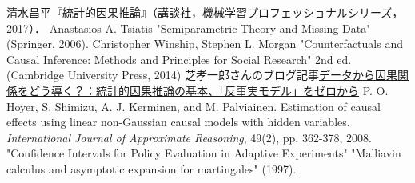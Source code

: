 \documentclass[uplatex,dvipdfmx]{jsreport}
\begin{document}
\begin{thebibliography}{99}
    清水昌平『統計的因果推論』（講談社，機械学習プロフェッショナルシリーズ，2017）．
    Anastasios A. Tsiatis "Semiparametric Theory and Missing Data" (Springer, 2006).
    Christopher Winship, Stephen L. Morgan "Counterfactuals and Causal Inference: Methods and Principles for Social Research" 2nd ed. (Cambridge University Press, 2014)
    芝孝一郎さんのブログ記事\href{https://www.krsk-phs.com/entry/counterfactual_assumptions}{データから因果関係をどう導く？：統計的因果推論の基本、「反事実モデル」をゼロから}
    P. O. Hoyer, S. Shimizu, A. J. Kerminen, and M. Palviainen. Estimation of causal effects using linear non-Gaussian causal models with hidden variables. \textit{International Journal of Approximate Reasoning}, 49(2), pp. 362-378, 2008.
    "Confidence Intervals for Policy Evaluation in Adaptive Experiments"
    "Malliavin calculus and asymptotic expansion for martingales" (1997).

\end{thebibliography}
\end{document}
